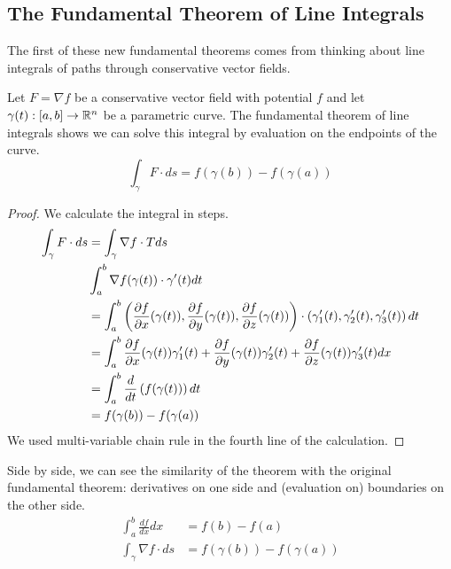 \documentclass[fleqn,letterpaper]{report}
\begin{document}
\subsection{The Fundamental Theorem of Line Integrals}
\label{fundamental-theorem-line-integrals}

The first of these new fundamental theorems comes from
thinking about line integrals of paths through conservative
vector fields. 

\begin{thm}
Let $F = \nabla f$ be a conservative vector field with
potential $f$ and let $\gamma(t): [a,b] \rightarrow \mathbb{R}^n$ be
a parametric curve. The fundamental theorem of line integrals
shows we can solve this integral by evaluation on the
endpoints of the curve.
\begin{equation*}
\int_{\gamma} F \cdot ds = f(\gamma(b)) - f(\gamma(a))
\end{equation*}
\end{thm}

\begin{proof}
We calculate the integral in steps. 
\begin{align*}
\int_{\gamma} F \cdot ds & = \int_{\gamma} \nabla f \cdot T
ds \\
& \int_a^b \nabla f(\gamma(t)) \cdot \gamma^\prime(t) dt \\
& = \int_a^b \left( \frac{\partial f}{\partial x} (\gamma(t)),
\frac{\partial f}{\partial y} (\gamma(t)), \frac{\partial f}{\partial z}
(\gamma(t)) \right) \cdot \left( \gamma_1^\prime(t),
\gamma_2^\prime(t), \gamma_3^\prime(t) \right) dt \\
& = \int_a^b \frac{\partial f}{\partial x} (\gamma(t))
\gamma_1^\prime(t) + \frac{\partial f}{\partial y} (\gamma(t))
\gamma_2^\prime(t) + \frac{\partial f}{\partial z} (\gamma(t))
\gamma_3^\prime(t) dx \\
& = \int_a^b \frac{d}{dt} \left( f(\gamma(t)) \right) dt \\
& = f(\gamma(b)) - f(\gamma(a))
\end{align*}
We used multi-variable chain rule in the fourth
line of the calculation. 
\end{proof}

Side by side, we can see the similarity of the theorem with
the original fundamental theorem: derivatives on one side and
(evaluation on) boundaries on the other side.
\begin{align*}
\int_a^b \frac{df}{dx} dx & = f(b) - f(a) \\
\int_{\gamma} \nabla f \cdot ds & = f(\gamma(b)) -
f(\gamma(a))
\end{align*}
\end{document}
